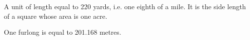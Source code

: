 A unit of length equal to 220 yards, i.e. one eighth of a mile. It is
the side length of a square whose area is one acre.
\par
One furlong is equal to 201.168 metres.